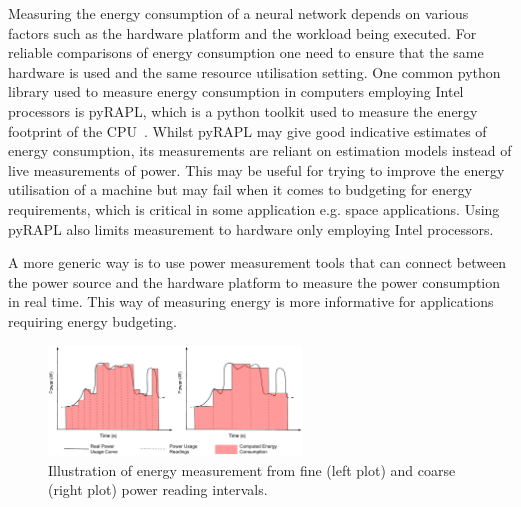 Measuring the energy consumption of a neural network depends on various factors such as the hardware platform and the workload being executed. 
%
For reliable comparisons of energy consumption one need to ensure that the same hardware is used and the same resource utilisation setting.
%
One common python library used to measure energy consumption in computers employing Intel processors is pyRAPL, which is a python toolkit used to measure the energy footprint of the CPU~\cite{pyRAPL_repo}.  
%
Whilst pyRAPL may give good indicative estimates of energy consumption, its measurements are reliant on estimation models instead of live measurements of power. 
%
This may be useful for trying to improve the energy utilisation of a machine but may fail when it comes to budgeting for energy requirements, which is critical in some application e.g. space applications.
%
Using pyRAPL also limits measurement to hardware only employing Intel processors. 

%
A more generic  way is to use power measurement tools that can connect between the power source and the hardware platform to measure the power consumption in real time.%
%
This way of measuring energy is more informative for applications requiring energy budgeting. 

\begin{figure}[h]
    \centering
    \includegraphics[width=0.6\textwidth]{other/figures/energy_measurment_schematic.pdf}
    \caption{Illustration of energy measurement from fine (left plot) and coarse (right plot) power reading intervals.}
    \label{fig:energy_illustration}
\end{figure}

